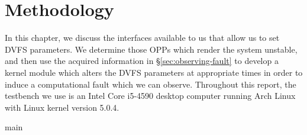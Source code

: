 \chapter{Methodology}

In this chapter, we discuss the interfaces available to us that allow us to set
DVFS parameters. We determine those OPPs which render the system unstable, and
then use the acquired information in §\ref{sec:observing-fault} to develop a
kernel module which alters the DVFS parameters at appropriate times in order to
induce a computational fault which we can observe. Throughout this report, the
testbench we use is an Intel Core i5-4590 desktop computer running Arch Linux
with Linux kernel version 5.0.4.

{main}






